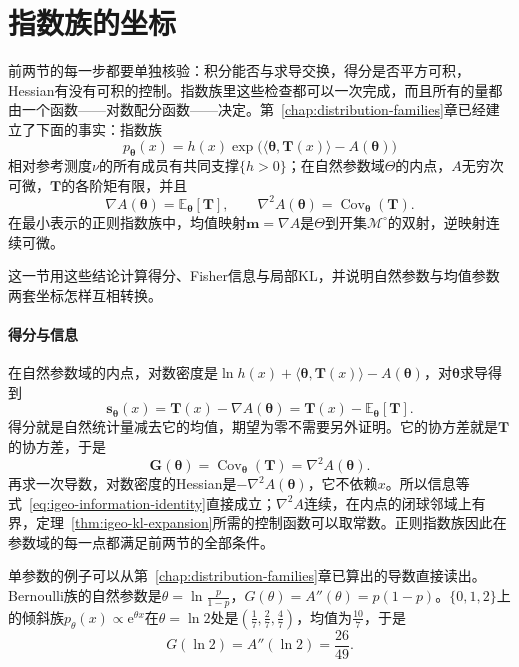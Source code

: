 \section{指数族的坐标}
\label{sec:igeo-exponential}

前两节的每一步都要单独核验：积分能否与求导交换，得分是否平方可积，Hessian有没有可积的控制。指数族里这些检查都可以一次完成，而且所有的量都由一个函数——对数配分函数——决定。第~\ref{chap:distribution-families}章已经建立了下面的事实：指数族
\[
  p_{\bm{\theta}}(x)=h(x)\exp\bigl(\langle\bm{\theta},\bm{T}(x)\rangle-A(\bm{\theta})\bigr)
\]
相对参考测度$\nu$的所有成员有共同支撑$\{h>0\}$；在自然参数域$\Theta$的内点，$A$无穷次可微，$\bm{T}$的各阶矩有限，并且
\[
  \nabla A(\bm{\theta})=\mathbb{E}_{\bm{\theta}}[\bm{T}],\qquad\nabla^{2}A(\bm{\theta})=\operatorname{Cov}_{\bm{\theta}}(\bm{T}).
\]
在最小表示的正则指数族中，均值映射$\bm{m}=\nabla A$是$\Theta$到开集$\mathcal{M}^{\circ}$的双射，逆映射连续可微。

这一节用这些结论计算得分、Fisher信息与局部KL，并说明自然参数与均值参数两套坐标怎样互相转换。

\paragraph{得分与信息}
在自然参数域的内点，对数密度是$\ln h(x)+\langle\bm{\theta},\bm{T}(x)\rangle-A(\bm{\theta})$，对$\bm{\theta}$求导得到
\begin{equation}
  \bm{s}_{\bm{\theta}}(x)=\bm{T}(x)-\nabla A(\bm{\theta})=\bm{T}(x)-\mathbb{E}_{\bm{\theta}}[\bm{T}].
  \label{eq:igeo-expfam-score}
\end{equation}
得分就是自然统计量减去它的均值，期望为零不需要另外证明。它的协方差就是$\bm{T}$的协方差，于是
\begin{equation}
  \bm{G}(\bm{\theta})=\operatorname{Cov}_{\bm{\theta}}(\bm{T})=\nabla^{2}A(\bm{\theta}).
  \label{eq:igeo-expfam-fisher}
\end{equation}
再求一次导数，对数密度的Hessian是$-\nabla^{2}A(\bm{\theta})$，它不依赖$x$。所以信息等式~\eqref{eq:igeo-information-identity}直接成立；$\nabla^{2}A$连续，在内点的闭球邻域上有界，定理~\ref{thm:igeo-kl-expansion}所需的控制函数可以取常数。正则指数族因此在参数域的每一点都满足前两节的全部条件。

单参数的例子可以从第~\ref{chap:distribution-families}章已算出的导数直接读出。Bernoulli族的自然参数是$\theta=\ln\frac{p}{1-p}$，$G(\theta)=A''(\theta)=p(1-p)$。$\{0,1,2\}$上的倾斜族$p_{\theta}(x)\propto\mathrm{e}^{\theta x}$在$\theta=\ln2$处是$(\frac17,\frac27,\frac47)$，均值为$\frac{10}{7}$，于是
\[
  G(\ln2)=A''(\ln2)=\frac{26}{49}.
\]

